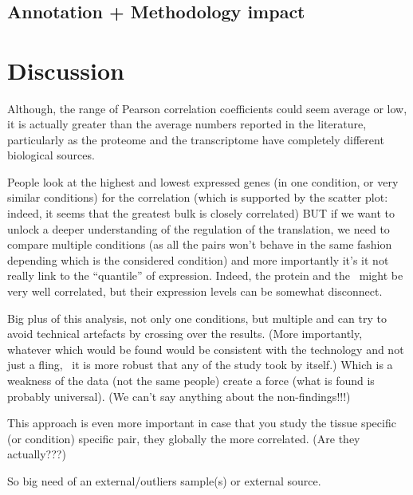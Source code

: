 \clearpage\


\subsection{Annotation + Methodology impact}


\section{Discussion}

Although, the range of Pearson correlation coefficients could seem average or
low, it is actually greater than the average numbers reported in the literature,
particularly as the proteome and the transcriptome have completely different
biological sources.


People look at the highest and lowest expressed genes (in one condition, or very
similar conditions) for the correlation (which is supported by the scatter plot:
indeed, it seems that the greatest bulk is closely correlated) {\Large BUT} if we
want to unlock a deeper understanding of the regulation of the translation, we need
to compare multiple conditions (as all the pairs won't behave in the same fashion
depending which is the considered condition) and more importantly it's it not
really link to the ``quantile'' of expression. Indeed, the protein and the \mRNA\
might be very well correlated, but their expression levels can be somewhat disconnect.

Big plus of this analysis, not only one conditions, but multiple and can try to
avoid technical artefacts by crossing over the results. (More importantly, whatever
which would be found would be consistent with the technology and not just a fling,
\ie\ it is more robust that any of the study took by itself.)
Which is a weakness of the data (not the same people) create a force (what is found
is probably universal). (We can't say anything about the non-findings!!!)

This approach is even more important in case that you study the tissue specific
(or condition) specific pair, they globally the more correlated. (Are they actually???)

So big need of an external/outliers sample(s) or external source.


\begin{comment}
\TK{Proteome sensé être plus conserver que le RNA : citation}
\end{comment}

